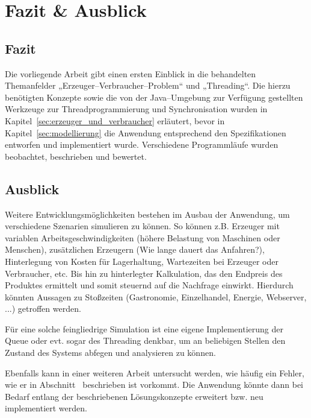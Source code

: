 \section{Fazit \& Ausblick} %
\label{sec:fazit_ausblick}

\subsection{Fazit} %
\label{sub:fazit}
Die vorliegende Arbeit gibt einen ersten Einblick in die behandelten Themanfelder „Erzeuger–Verbraucher–Problem“ und „Threading“. Die hierzu benötigten Konzepte sowie die von der Java–Umgebung zur Verfügung gestellten Werkzeuge zur Threadprogrammierung und Synchronisation wurden in Kapitel~\ref{sec:erzeuger_und_verbraucher} erläutert, bevor in Kapitel~\ref{sec:modellierung} die Anwendung entsprechend den Spezifikationen entworfen und implementiert wurde. Verschiedene Programmläufe wurden beobachtet, beschrieben und bewertet.


\subsection{Ausblick} %
\label{sub:ausblick}
Weitere Entwicklungsmöglichkeiten bestehen im Ausbau der Anwendung, um verschiedene Szenarien simulieren zu können. So können z.B. Erzeuger mit variablen Arbeitsgeschwindigkeiten (höhere Belastung von Maschinen oder Menschen), zusätzlichen Erzeugern (Wie lange dauert das Anfahren?), Hinterlegung von Kosten für Lagerhaltung, Wartezeiten bei Erzeuger oder Verbraucher, etc. Bis hin zu hinterlegter Kalkulation, das den Endpreis des Produktes ermittelt und somit steuernd auf die Nachfrage einwirkt.
Hierdurch könnten Aussagen zu Stoßzeiten (Gastronomie, Einzelhandel, Energie, Webserver, ...) getroffen werden. 

Für eine solche feingliedrige Simulation ist eine eigene Implementierung der Queue oder evt. sogar des Threading denkbar, um an beliebigen Stellen den Zustand des Systems abfegen und analysieren zu können.

Ebenfalls kann in einer weiteren Arbeit untersucht werden, wie häufig ein Fehler, wie er in Abschnitt~ beschrieben ist vorkommt. Die Anwendung könnte dann bei Bedarf entlang der beschriebenen Lösungskonzepte erweitert bzw. neu implementiert werden.

